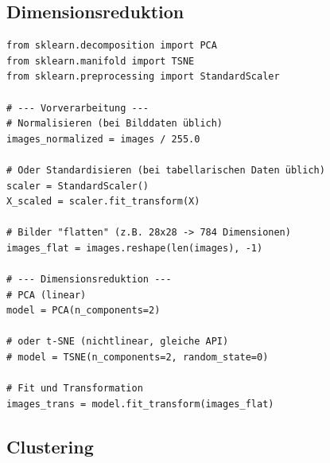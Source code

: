 \subsection{Dimensionsreduktion}\label{sec:08-dimensionsreduktion}
\begin{propertylist}[Faustregeln]
\end{propertylist}
\begin{codebox}
\begin{lstlisting}[style=CodeExpert]
from sklearn.decomposition import PCA
from sklearn.manifold import TSNE
from sklearn.preprocessing import StandardScaler

# --- Vorverarbeitung ---
# Normalisieren (bei Bilddaten üblich)
images_normalized = images / 255.0

# Oder Standardisieren (bei tabellarischen Daten üblich)
scaler = StandardScaler()
X_scaled = scaler.fit_transform(X)

# Bilder "flatten" (z.B. 28x28 -> 784 Dimensionen)
images_flat = images.reshape(len(images), -1)

# --- Dimensionsreduktion ---
# PCA (linear)
model = PCA(n_components=2)

# oder t-SNE (nichtlinear, gleiche API)
# model = TSNE(n_components=2, random_state=0)

# Fit und Transformation
images_trans = model.fit_transform(images_flat)
\end{lstlisting}
\end{codebox}
\subsection{Clustering}\label{sec:08-clustering}

